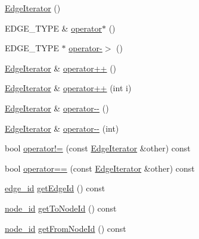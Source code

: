 \begin{DoxyCompactItemize}
\item 
\hyperlink{class_complex_network_1_1_edge_iterator_af5458a668ca6c4deaa1b1fba411e1a69}{Edge\+Iterator} ()
\item 
E\+D\+G\+E\+\_\+\+T\+Y\+P\+E \& \hyperlink{class_complex_network_1_1_edge_iterator_a85003b652701d93b0bf98021eed2721d}{operator$\ast$} ()
\item 
E\+D\+G\+E\+\_\+\+T\+Y\+P\+E $\ast$ \hyperlink{class_complex_network_1_1_edge_iterator_a92d9fac73988ac54b56d809ea3d1b6a9}{operator-\/$>$} ()
\item 
\hyperlink{class_complex_network_1_1_edge_iterator}{Edge\+Iterator} \& \hyperlink{class_complex_network_1_1_edge_iterator_ab0bee2f2db65f11ed37fdd1ca5106cd0}{operator++} ()
\item 
\hyperlink{class_complex_network_1_1_edge_iterator}{Edge\+Iterator} \& \hyperlink{class_complex_network_1_1_edge_iterator_a2780e80208934676778ab4345f333cb2}{operator++} (int i)
\item 
\hyperlink{class_complex_network_1_1_edge_iterator}{Edge\+Iterator} \& \hyperlink{class_complex_network_1_1_edge_iterator_a69cc23ad57c464ac46f1cb156afcfeaa}{operator-\/-\/} ()
\item 
\hyperlink{class_complex_network_1_1_edge_iterator}{Edge\+Iterator} \& \hyperlink{class_complex_network_1_1_edge_iterator_ab95b55c21b0ef4a2330f3846973dfdd7}{operator-\/-\/} (int)
\item 
bool \hyperlink{class_complex_network_1_1_edge_iterator_a5e7f11b1a78205d2d6422effff21956a}{operator!=} (const \hyperlink{class_complex_network_1_1_edge_iterator}{Edge\+Iterator} \&other) const 
\item 
bool \hyperlink{class_complex_network_1_1_edge_iterator_aaee13e1baecf30ada441a241235b7d5c}{operator==} (const \hyperlink{class_complex_network_1_1_edge_iterator}{Edge\+Iterator} \&other) const 
\item 
\hyperlink{_complex_network_8hpp_ad7d18d7b90a45b6625704e92d10aa3a0}{edge\+\_\+id} \hyperlink{class_complex_network_1_1_edge_iterator_a5d541920182baf32969dc8b2d6c278de}{get\+Edge\+Id} () const 
\item 
\hyperlink{_complex_network_8hpp_a8323334ca788fde39682469321590d52}{node\+\_\+id} \hyperlink{class_complex_network_1_1_edge_iterator_a10121b556cb2cdf1d33b757faf8029fe}{get\+To\+Node\+Id} () const 
\item 
\hyperlink{_complex_network_8hpp_a8323334ca788fde39682469321590d52}{node\+\_\+id} \hyperlink{class_complex_network_1_1_edge_iterator_a8abb7775d916c0d37aa1ac4e825530e2}{get\+From\+Node\+Id} () const 
\end{DoxyCompactItemize}
